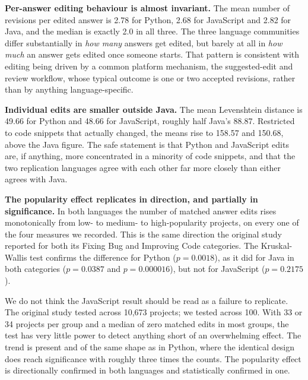 \documentclass[onecolumn,11pt]{IEEEtran}
\begin{document}
\textbf{Per-answer editing behaviour is almost invariant.}
The mean number of revisions per edited answer is 2.78 for Python, 2.68 for JavaScript and 2.82 for Java, and the median is exactly 2.0 in all three.
The three language communities differ substantially in \emph{how many} answers get edited, but barely at all in \emph{how much} an answer gets edited once someone starts.
That pattern is consistent with editing being driven by a common platform mechanism, the suggested-edit and review workflow, whose typical outcome is one or two accepted revisions, rather than by anything language-specific.

\textbf{Individual edits are smaller outside Java.}
The mean Levenshtein distance is 49.66 for Python and 48.66 for JavaScript, roughly half Java's 88.87.
Restricted to code snippets that actually changed, the means rise to 158.57 and 150.68, above the Java figure.
The safe statement is that Python and JavaScript edits are, if anything, more concentrated in a minority of code snippets, and that the two replication languages agree with each other far more closely than either agrees with Java.

\textbf{The popularity effect replicates in direction, and partially in significance.}
In both languages the number of matched answer edits rises monotonically from low- to medium- to high-popularity projects, on every one of the four measures we recorded.
This is the same direction the original study reported for both its Fixing Bug and Improving Code categories.
The Kruskal-Wallis test confirms the difference for Python ($p = 0.0018$), as it did for Java in both categories ($p = 0.0387$ and $p = 0.000016$), but not for JavaScript ($p = 0.2175$).

We do not think the JavaScript result should be read as a failure to replicate.
The original study tested across 10{,}673 projects; we tested across 100.
With 33 or 34 projects per group and a median of zero matched edits in most groups, the test has very little power to detect anything short of an overwhelming effect.
The trend is present and of the same shape as in Python, where the identical design does reach significance with roughly three times the counts.
The popularity effect is directionally confirmed in both languages and statistically confirmed in one.
\end{document}
